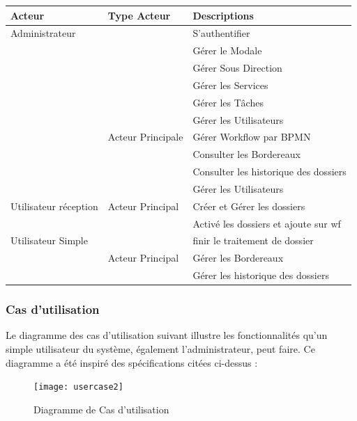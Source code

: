 \begin{table}[H]
	\begin{tabular}{|l|l|l|}
		\hline
		\multicolumn{1}{|l|}{Acteur} & Type Acteur & Descriptions \\ \hline
	Administrateur	 &  & S’authentifier \\ \cline{3-3} 
		&  & Gérer le Modale \\ \cline{3-3} 
		&  & Gérer Sous Direction \\ \cline{3-3} 
	 	&  & Gérer les Services \\ \cline{3-3} 	
	 	&  & Gérer les Tâches \\ \cline{3-3} 
		&  & Gérer les Utilisateurs \\ \cline{3-3} 
		& Acteur Principale & Gérer Workflow par BPMN  \\ \cline{3-3} 
				&  & Consulter les Bordereaux  \\ \cline{3-3} 
						&  &Consulter les historique des dossiers\\ \cline{3-3} 
								&  & Gérer les Utilisateurs \\ \hline 
		
  
			Utilisateur réception	 	&Acteur Principal & Créer et Gérer les dossiers  \\ \cline{3-3}  
		&  & Activé les dossiers et ajoute sur wf \\ \hline
 
		Utilisateur Simple	&  & finir le traitement de dossier  \\ \cline{3-3} 
		&  Acteur Principal& Gérer les Bordereaux  \\ \cline{3-3} 
		&  &Gérer les historique des dossiers\\ \hline 
	\end{tabular}
\end{table}
 
 \subsubsection{ Cas d’utilisation }
 Le diagramme des cas d’utilisation suivant illustre les fonctionnalités qu’un simple utilisateur du système, également l’administrateur, peut faire. Ce diagramme a été inspiré des spécifications citées ci-dessus :
 
 \begin{figure}[H]
 	\centering
 	\texttt{[image: usercase2]}
 	\caption{Diagramme de Cas d’utilisation}
 	\label{fig:usercase2}
 \end{figure}
 
